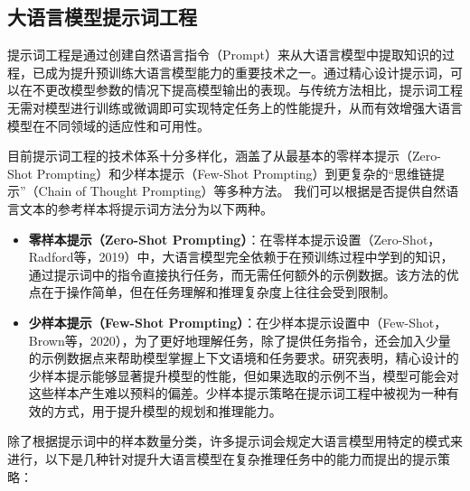 \subsection{大语言模型提示词工程}

提示词工程是通过创建自然语言指令（Prompt）来从大语言模型中提取知识的过程，已成为提升预训练大语言模型能力的重要技术之一。通过精心设计提示词，可以在不更改模型参数的情况下提高模型输出的表现。与传统方法相比，提示词工程无需对模型进行训练或微调即可实现特定任务上的性能提升，从而有效增强大语言模型在不同领域的适应性和可用性。

目前提示词工程的技术体系十分多样化，涵盖了从最基本的零样本提示（Zero-Shot Prompting）和少样本提示（Few-Shot Prompting）到更复杂的“思维链提示”（Chain of Thought Prompting）等多种方法。
我们可以根据是否提供自然语言文本的参考样本将提示词方法分为以下两种。

\begin{itemize}
    \item \textbf{零样本提示（Zero-Shot Prompting）}：在零样本提示设置（Zero-Shot，Radford等，2019）中，大语言模型完全依赖于在预训练过程中学到的知识，通过提示词中的指令直接执行任务，而无需任何额外的示例数据。该方法的优点在于操作简单，但在任务理解和推理复杂度上往往会受到限制。
    \item \textbf{少样本提示（Few-Shot Prompting）}：在少样本提示设置中（Few-Shot，Brown等，2020），为了更好地理解任务，除了提供任务指令，还会加入少量的示例数据点来帮助模型掌握上下文语境和任务要求。研究表明，精心设计的少样本提示能够显著提升模型的性能，但如果选取的示例不当，模型可能会对这些样本产生难以预料的偏差。少样本提示策略在提示词工程中被视为一种有效的方式，用于提升模型的规划和推理能力。
\end{itemize}

除了根据提示词中的样本数量分类，许多提示词会规定大语言模型用特定的模式来进行，以下是几种针对提升大语言模型在复杂推理任务中的能力而提出的提示策略：

